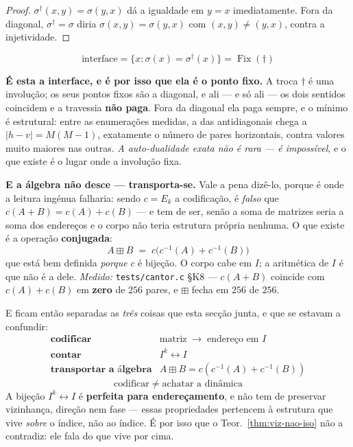 \documentclass[11pt,a4paper]{article}
\newcommand{\code}[1]{\texttt{\small #1}}
\begin{document}
\begin{proof}
$\sigma^{\dagger}(x,y)=\sigma(y,x)$ dá a igualdade em $y=x$ imediatamente. Fora da
diagonal, $\sigma^{\dagger}=\sigma$ diria $\sigma(x,y)=\sigma(y,x)$ com
$(x,y)\neq(y,x)$, contra a injetividade.
\end{proof}

\[
\boxed{\;\text{interface}=\{x:\sigma(x)=\sigma^{\dagger}(x)\}=\operatorname{Fix}(\dagger)\;}
\]

\noindent\textbf{É esta a interface, e é por isso que ela é o ponto fixo.} A troca
$\dagger$ é uma involução; os seus pontos fixos são a diagonal, e ali --- e só ali ---
os dois sentidos coincidem e a travessia \textbf{não paga}. Fora da diagonal ela paga
sempre, e o mínimo é estrutural: entre as enumerações medidas, a das antidiagonais
chega a $\lvert h-v\rvert=M(M-1)$, exatamente o número de pares horizontais, contra
valores muito maiores nas outras. \emph{A auto-dualidade exata não é rara --- é
impossível}, e o que existe é o lugar onde a involução fixa.

\medskip\noindent\textbf{E a álgebra não desce --- transporta-se.} Vale a pena
dizê-lo, porque é onde a leitura ingénua falharia: sendo $c=E_k$ a codificação, é
\emph{falso} que $c(A+B)=c(A)+c(B)$ --- e tem de ser, senão a soma de matrizes seria
a soma dos endereços e o corpo não teria estrutura própria nenhuma. O que existe é a
operação \textbf{conjugada}:
\[
\boxed{\;A\boxplus B \;=\; c\bigl(c^{-1}(A)+c^{-1}(B)\bigr)\;}
\]
que está bem definida \emph{porque} $c$ é bijeção. O corpo cabe em $I$; a aritmética
de $I$ é que não é a dele. \emph{Medido:} \code{tests/cantor.c} §K8 --- $c(A+B)$
coincide com $c(A)+c(B)$ em \textbf{zero} de $256$ pares, e $\boxplus$ fecha em
$256$ de $256$.

\medskip\noindent E ficam então separadas as \emph{três} coisas que esta secção
junta, e que se estavam a confundir:
\[
\begin{array}{ll}
\textbf{codificar} & \text{matriz}\;\to\;\text{endereço em }I\\
\textbf{contar} & I^{k}\leftrightarrow I\\
\textbf{transportar a álgebra} & A\boxplus B=c(c^{-1}(A)+c^{-1}(B))
\end{array}
\]
\[
\boxed{\;\text{codificar}\;\neq\;\text{achatar a dinâmica}\;}
\]
A bijeção $I^{k}\leftrightarrow I$ é \textbf{perfeita para endereçamento}, e não
tem de preservar vizinhança, direção nem fase --- essas propriedades pertencem à
estrutura que vive \emph{sobre} o índice, não ao índice. É por isso que o
Teor.~\ref{thm:viz-nao-iso} não a contradiz: ele fala do que vive por cima.
\end{document}
